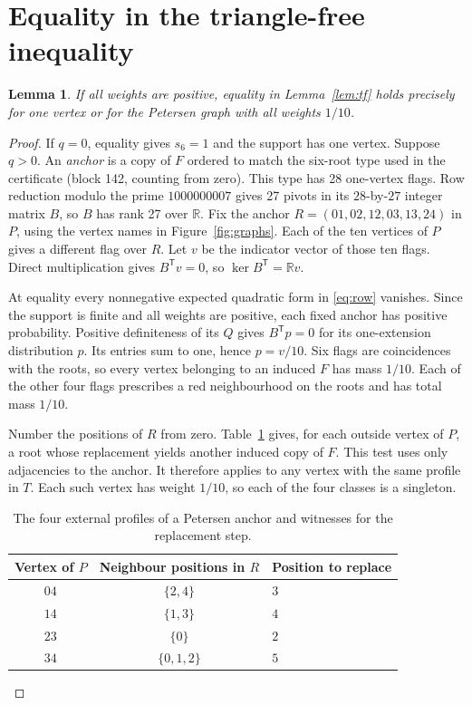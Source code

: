 \documentclass[11pt,a4paper]{article}
\newtheorem{lemma}[theorem]{Lemma}
\newcommand{\trans}{\mathsf T}
\begin{document}
\section{Equality in the triangle-free inequality}\label{sec:equality}

\begin{lemma}\label{lem:equality}
If all weights are positive, equality in Lemma~\ref{lem:tf} holds precisely for one vertex or for the Petersen graph with all weights \(1/10\).
\end{lemma}

\begin{proof}
If \(q=0\), equality gives \(s_6=1\) and the support has one vertex. Suppose \(q>0\). An \emph{anchor} is a copy of \(F\) ordered to match the six-root type used in the certificate (block 142, counting from zero). This type has 28 one-vertex flags. Row reduction modulo the prime \(1000000007\) gives 27 pivots in its \(28\)-by-\(27\) integer matrix \(B\), so \(B\) has rank 27 over \(\mathbb R\). Fix the anchor \(R=(01,02,12,03,13,24)\) in \(P\), using the vertex names in Figure~\ref{fig:graphs}. Each of the ten vertices of \(P\) gives a different flag over \(R\). Let \(v\) be the indicator vector of those ten flags. Direct multiplication gives \(B^{\trans}v=0\), so \(\ker B^{\trans}=\mathbb R v\).

At equality every nonnegative expected quadratic form in \eqref{eq:row} vanishes. Since the support is finite and all weights are positive, each fixed anchor has positive probability. Positive definiteness of its \(Q\) gives \(B^{\trans}p=0\) for its one-extension distribution \(p\). Its entries sum to one, hence \(p=v/10\). Six flags are coincidences with the roots, so every vertex belonging to an induced \(F\) has mass \(1/10\). Each of the other four flags prescribes a red neighbourhood on the roots and has total mass \(1/10\).

Number the positions of \(R\) from zero. Table~\ref{tab:profiles} gives, for each outside vertex of \(P\), a root whose replacement yields another induced copy of \(F\). This test uses only adjacencies to the anchor. It therefore applies to any vertex with the same profile in \(T\). Each such vertex has weight \(1/10\), so each of the four classes is a singleton.

\begin{table}[htb]
\centering
\begin{tabular}{ccl}
\toprule
Vertex of \(P\) & Neighbour positions in \(R\) & Position to replace\\
\midrule
\(04\) & \(\{2,4\}\) & \(3\)\\
\(14\) & \(\{1,3\}\) & \(4\)\\
\(23\) & \(\{0\}\)   & \(2\)\\
\(34\) & \(\{0,1,2\}\) & \(5\)\\
\bottomrule
\end{tabular}
\caption{The four external profiles of a Petersen anchor and witnesses for the replacement step.}\label{tab:profiles}
\end{table}


\end{proof}
\end{document}
